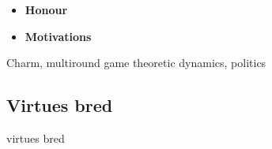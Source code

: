 

\begin{itemize}
    \item \textbf{Honour}
    \item \textbf{Motivations}
\end{itemize}


Charm, multiround game theoretic dynamics, politics 


\subsection{Virtues bred}
virtues bred 







